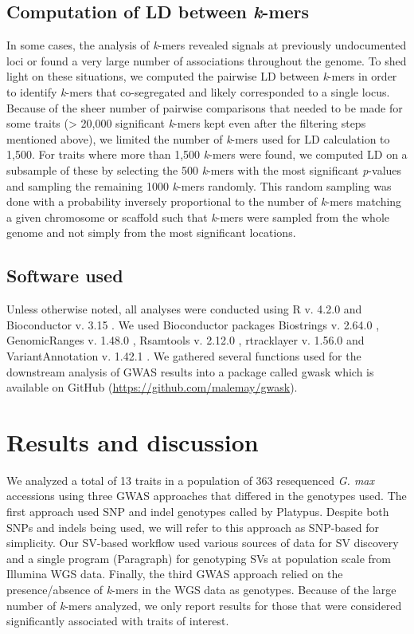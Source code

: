 \documentclass{article}
\begin{document}
\subsection*{Computation of LD between \emph{k}-mers}

In some cases, the analysis of \emph{k}-mers revealed signals at previously
undocumented loci or found a very large number of associations throughout the
genome. To shed light on these situations, we computed the pairwise LD between
\emph{k}-mers in order to identify \emph{k}-mers that co-segregated and
likely corresponded to a single locus. Because of the sheer number of pairwise
comparisons that needed to be made for some traits (> 20,000 significant
\emph{k}-mers kept even after the filtering steps mentioned above), we limited
the number of \emph{k}-mers used for LD calculation to 1,500. For traits where
more than 1,500 \emph{k}-mers were found, we computed LD on a subsample of
these by selecting the 500 \emph{k}-mers with the most significant
\emph{p}-values and sampling the remaining 1000 \emph{k}-mers randomly. This
random sampling was done with a probability inversely proportional to the
number of \emph{k}-mers matching a given chromosome or scaffold such that
\emph{k}-mers were sampled from the whole genome and not simply from the most
significant locations.

\subsection*{Software used}
\label{sv-gwas-software-used}

Unless otherwise noted, all analyses were conducted using R v. 4.2.0
 and Bioconductor v. 3.15 . We used Bioconductor
packages Biostrings v. 2.64.0 , GenomicRanges v. 1.48.0
, Rsamtools v. 2.12.0 , rtracklayer v.
1.56.0  and VariantAnnotation v. 1.42.1
.  We gathered several functions used for the downstream
analysis of GWAS results into a package called gwask which is available on
GitHub (\url{https://github.com/malemay/gwask}).

\clearpage

\section*{Results and discussion}

We analyzed a total of 13 traits in a population of 363 resequenced \textit{G.
max} accessions using three GWAS approaches that differed in the genotypes
used. The first approach used SNP and indel genotypes called by Platypus.
Despite both SNPs and indels being used, we will refer to this approach as
SNP-based for simplicity. Our SV-based workflow used various sources of data
for SV discovery and a single program (Paragraph) for genotyping SVs at
population scale from Illumina WGS data. Finally, the third GWAS approach
relied on the presence/absence of \textit{k}-mers in the WGS data as genotypes.
Because of the large number of \textit{k}-mers analyzed, we only report results
for those that were considered significantly associated with traits of
interest.
\end{document}
